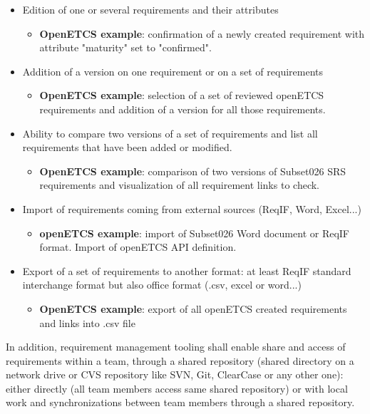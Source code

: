 \documentclass[11pt]{template/openetcs_report}
\begin{document}
\begin{itemize}
\item Edition of one or several requirements and their attributes
\begin{itemize} \item \textbf{OpenETCS example}: confirmation of a newly created requirement with attribute "maturity" set to "confirmed".\end{itemize}

\item Addition of a version on one requirement or on a set of requirements
\begin{itemize} \item \textbf{OpenETCS example}: selection of a set of reviewed openETCS requirements and addition of a version for all those requirements.\end{itemize}

\item Ability to compare two versions of a set of requirements and list all requirements that have been added or modified.
\begin{itemize} \item \textbf{OpenETCS example}: comparison of two versions of Subset026 SRS requirements and visualization of all requirement links to check.\end{itemize}

\item Import of requirements coming from external sources (ReqIF, Word, Excel...)
\begin{itemize} \item \textbf{openETCS example}: import of Subset026 Word document or ReqIF format. Import of openETCS API definition.\end{itemize}

\item Export of a set of requirements to another format: at least ReqIF standard interchange format but also office format (.csv, excel or word...) \begin{itemize} \item \textbf{OpenETCS example}: export of all openETCS created requirements and links into .csv file \end{itemize}

\end{itemize}

In addition, requirement management tooling shall enable share and access of requirements within a team, through a shared repository (shared directory on a network drive or CVS repository like SVN, Git, ClearCase or any other one): either directly (all team members access same shared repository) or with local work and synchronizations between team members through a shared repository.
\end{document}

